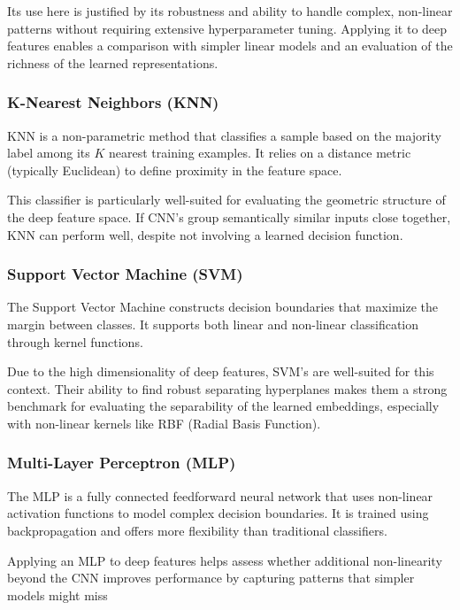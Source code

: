 \documentclass[journal,article,submit,pdftex,moreauthors]{Definitions/mdpi}
\begin{document}
Its use here is justified by its robustness and ability to handle complex, non-linear patterns without requiring extensive hyperparameter tuning. Applying it to deep features enables a comparison with simpler linear models and an evaluation of the richness of the learned representations.

\subsubsection*{K-Nearest Neighbors (KNN)}

KNN is a non-parametric method that classifies a sample based on the majority label among its $K$ nearest training examples. It relies on a distance metric (typically Euclidean) to define proximity in the feature space.

This classifier is particularly well-suited for evaluating the geometric structure of the deep feature space. If CNN's group semantically similar inputs close together, KNN can perform well, despite not involving a learned decision function.

\subsubsection*{Support Vector Machine (SVM)}

The Support Vector Machine constructs decision boundaries that maximize the margin between classes. It supports both linear and non-linear classification through kernel functions.

Due to the high dimensionality of deep features, SVM's are well-suited for this context. Their ability to find robust separating hyperplanes makes them a strong benchmark for evaluating the separability of the learned embeddings, especially with non-linear kernels like RBF (Radial Basis Function).

\subsubsection*{Multi-Layer Perceptron (MLP)}

The MLP is a fully connected feedforward neural network that uses non-linear activation functions to model complex decision boundaries. It is trained using backpropagation and offers more flexibility than traditional classifiers.

Applying an MLP to deep features helps assess whether additional non-linearity beyond the CNN improves performance by capturing patterns that simpler models might miss
\end{document}
